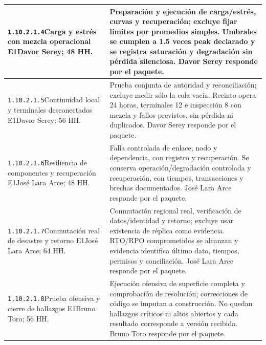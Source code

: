 \begin{longtable}{L{52mm}L{91mm}}
\texttt{1.\allowbreak{}10.\allowbreak{}2.\allowbreak{}1.\allowbreak{}4}\newline Carga y estrés con mezcla operacional E1\newline Davor Serey; 48 HH. & Preparación y ejecución de carga/estrés, curvas y recuperación; excluye fijar límites por promedios simples. Umbrales se cumplen a 1.5 veces peak declarado y se registra saturación y degradación sin pérdida silenciosa. Davor Serey responde por el paquete.\\\hline
\texttt{1.\allowbreak{}10.\allowbreak{}2.\allowbreak{}1.\allowbreak{}5}\newline Continuidad local y terminales desconectados E1\newline Davor Serey; 56 HH. & Prueba conjunta de autoridad y reconciliación; excluye medir sólo la cola vacía. Recinto opera 24 horas, terminales 12 e inspección 8 con mezcla y fallos previstos, sin pérdida ni duplicados. Davor Serey responde por el paquete.\\\hline
\texttt{1.\allowbreak{}10.\allowbreak{}2.\allowbreak{}1.\allowbreak{}6}\newline Resiliencia de componentes y recuperación E1\newline José Lara Arce; 48 HH. & Falla controlada de enlace, nodo y dependencia, con registro y recuperación. Se conserva operación/degradación controlada y recuperación, con tiempos, transacciones y brechas documentados. José Lara Arce responde por el paquete.\\\hline
\texttt{1.\allowbreak{}10.\allowbreak{}2.\allowbreak{}1.\allowbreak{}7}\newline Conmutación real de desastre y retorno E1\newline José Lara Arce; 64 HH. & Conmutación regional real, verificación de datos/identidad y retorno; excluye usar existencia de réplica como evidencia. RTO/RPO comprometidos se alcanzan y evidencia identifica último dato, tiempos, permisos y conciliación. José Lara Arce responde por el paquete.\\\hline
\texttt{1.\allowbreak{}10.\allowbreak{}2.\allowbreak{}1.\allowbreak{}8}\newline Prueba ofensiva y cierre de hallazgos E1\newline Bruno Toro; 56 HH. & Ejecución ofensiva de superficie completa y comprobación de resolución; correcciones de código se imputan a construcción. No quedan hallazgos críticos ni altos abiertos y cada resultado corresponde a versión recibida. Bruno Toro responde por el paquete.\\\hline

\end{longtable}
